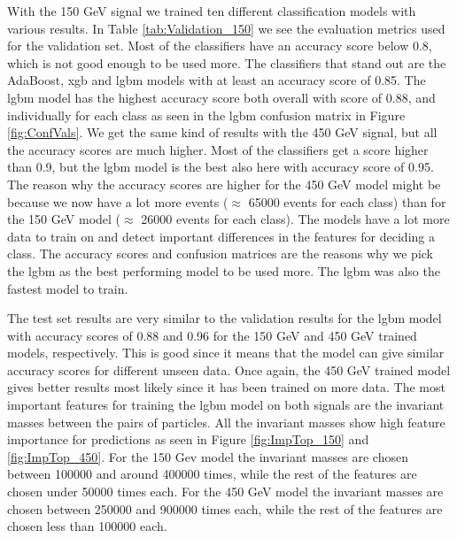 \documentclass[a4paper, american, 12pt]{report}
\begin{document}
	With the 150 GeV signal we trained ten different classification models with various results. In Table \ref{tab:Validation_150} we see the evaluation metrics used for the validation set. Most of the classifiers have an accuracy score below 0.8, which is not good enough to be used more. The classifiers that stand out are the AdaBoost, \acrshort{xgb} and \acrshort{lgbm} models with at least an accuracy score of 0.85. The \acrshort{lgbm} model has the highest accuracy score both overall with score of 0.88, and individually for each class as seen in the \acrshort{lgbm} confusion matrix in Figure \ref{fig:ConfVals}. We get the same kind of results with the 450 GeV signal, but all the accuracy scores are much higher. Most of the classifiers get a score higher than 0.9, but the \acrshort{lgbm} model is the best also here with accuracy score of 0.95. The reason why the accuracy scores are higher for the 450 GeV model might be because we now have a lot more events ($\approx$ 65000 events for each class) than for the 150 GeV model ($\approx$ 26000 events for each class). The models have a lot more data to train on and detect important differences in the features for deciding a class. The accuracy scores and confusion matrices are the reasons why we pick the \acrshort{lgbm} as the best performing model to be used more. The \acrshort{lgbm} was also the fastest model to train.

	The test set results are very similar to the validation results for the \acrshort{lgbm} model with accuracy scores of 0.88 and 0.96 for the 150 GeV and 450 GeV trained models, respectively. This is good since it means that the model can give similar accuracy scores for different unseen data. Once again, the 450 GeV trained model gives better results most likely since it has been trained on more data. The most important features for training the \acrshort{lgbm} model on both signals are the invariant masses between the pairs of particles. All the invariant masses show high feature importance for predictions as seen in Figure \ref{fig:ImpTop_150} and \ref{fig:ImpTop_450}. For the 150 Gev model the invariant masses are chosen between 100000 and around 400000 times, while the rest of the features are chosen under 50000 times each. For the 450 GeV model the invariant masses are chosen between 250000 and 900000 times each, while the rest of the features are chosen less than 100000 each.

	
\end{document}
